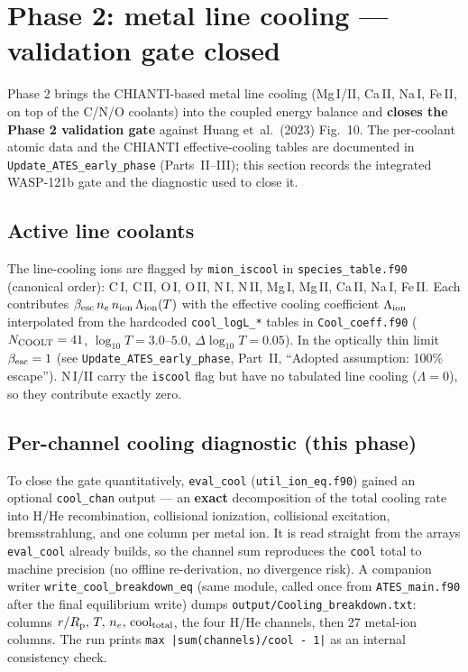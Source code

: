 \documentclass[english,a4paper]{kiseon_memo}
\begin{document}
\section{Phase 2: metal line cooling --- validation gate closed}

Phase 2 brings the CHIANTI-based metal line cooling (Mg\,I/II, Ca\,II, Na\,I,
Fe\,II, on top of the C/N/O coolants) into the coupled energy balance and
\textbf{closes the Phase 2 validation gate} against Huang et~al.\ (2023) Fig.~10.
The per-coolant atomic data and the CHIANTI effective-cooling tables are
documented in \texttt{Update\_ATES\_early\_phase} (Parts~II--III); this section records the integrated
WASP-121b gate and the diagnostic used to close it.

\subsection{Active line coolants}

The line-cooling ions are flagged by \verb|mion_iscool| in
\texttt{species\_table.f90} (canonical order): C\,I, C\,II, O\,I, O\,II, N\,I,
N\,II, Mg\,I, Mg\,II, Ca\,II, Na\,I, Fe\,II. Each contributes
\(\beta_{\rm esc}\,n_e\,n_{\rm ion}\,\Lambda_{\rm ion}(T)\) with the effective
cooling coefficient \(\Lambda_{\rm ion}\) interpolated from the hardcoded
\verb|cool_logL_*| tables in \texttt{Cool\_coeff.f90}
(\(N_{\rm COOLT}=41\), \(\log_{10}T=3.0\)--\(5.0\), \(\Delta\log_{10}T=0.05\)).
In the optically thin limit \(\beta_{\rm esc}=1\) (see
\texttt{Update\_ATES\_early\_phase}, Part~II, ``Adopted assumption: 100\% escape'').
N\,I/II carry the \verb|iscool| flag but have no tabulated line cooling
(\(\Lambda=0\)), so they contribute exactly zero.

\subsection{Per-channel cooling diagnostic (this phase)}

To close the gate quantitatively, \verb|eval_cool| (\texttt{util\_ion\_eq.f90})
gained an optional \verb|cool_chan| output --- an \textbf{exact} decomposition of
the total cooling rate into H/He recombination, collisional ionization,
collisional excitation, bremsstrahlung, and one column per metal ion. It is read
straight from the arrays \verb|eval_cool| already builds, so the channel sum
reproduces the \verb|cool| total to machine precision (no offline re-derivation,
no divergence risk). A companion writer \verb|write_cool_breakdown_eq| (same
module, called once from \texttt{ATES\_main.f90} after the final equilibrium
write) dumps \texttt{output/Cooling\_breakdown.txt}: columns
\(r/R_{\rm p},\,T,\,n_e,\,\text{cool}_{\rm total}\), the four H/He channels, then
27 metal-ion columns. The run prints \verb!max |sum(channels)/cool - 1|! as an
internal consistency check.
\end{document}
